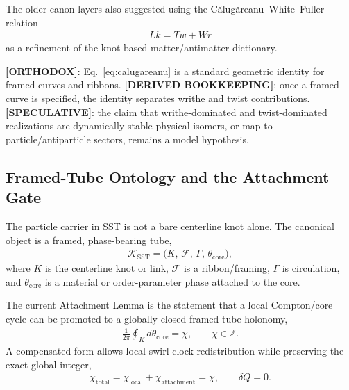 \documentclass[11pt]{article}
\theoremstyle{definition}
\theoremstyle{plain}
\theoremstyle{remark}
\begin{document}
        The older canon layers also suggested using the C\u{a}lug\u{a}reanu--White--Fuller relation
        \begin{align}
            Lk = Tw + Wr
            \label{eq:calugareanu}
        \end{align}
        as a refinement of the knot-based matter/antimatter dictionary.

        \textbf{[ORTHODOX]}: Eq.~\eqref{eq:calugareanu} is a standard geometric identity for framed curves and ribbons.\newline
        \textbf{[DERIVED BOOKKEEPING]}: once a framed curve is specified, the identity separates writhe and twist contributions.\newline
        \textbf{[SPECULATIVE]}: the claim that writhe-dominated and twist-dominated realizations are dynamically stable physical isomers, or map to particle/antiparticle sectors, remains a model hypothesis.


    \subsection{Framed-Tube Ontology and the Attachment Gate}
        \label{subsec:framed_tube_attachment_gate}

        The particle carrier in SST is not a bare centerline knot alone. The canonical object is a framed, phase-bearing tube,
        \begin{align}
            \mathcal{K}_{\mathrm{SST}}
            =
            \big(K,\,\mathcal{F},\,\Gamma,\,\theta_{\mathrm{core}}\big),
        \end{align}
        where $K$ is the centerline knot or link, $\mathcal{F}$ is a ribbon/framing, $\Gamma$ is circulation, and $\theta_{\mathrm{core}}$ is a material or order-parameter phase attached to the core.

        The current Attachment Lemma is the statement that a local Compton/core cycle can be promoted to a globally closed framed-tube holonomy,
        \begin{align}
            \frac{1}{2\pi}\oint_K d\theta_{\mathrm{core}}
            = \chi,
            \qquad
            \chi\in\mathbb{Z}.
            \label{eq:attachment_gate_chi}
        \end{align}
        A compensated form allows local swirl-clock redistribution while preserving the exact global integer,
        \begin{align}
            \chi_{\mathrm{total}}
            =
            \chi_{\mathrm{local}}+\chi_{\mathrm{attachment}}
            = \chi,
            \qquad
            \delta Q=0.
            \label{eq:compensated_attachment_gate}
        \end{align}
\end{document}
